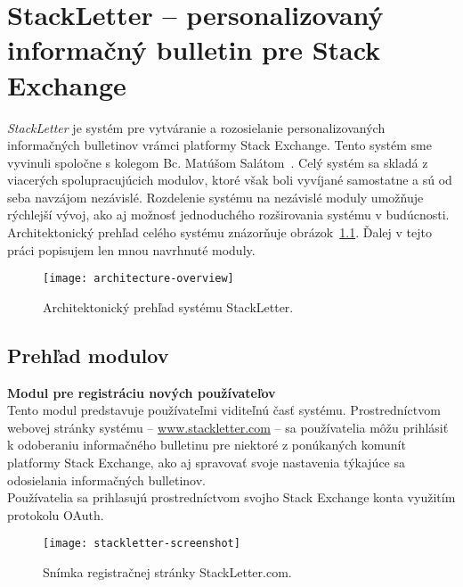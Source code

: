 \newpage
\chapter{StackLetter -- personalizovaný informačný bulletin pre Stack Exchange}

\textit{StackLetter} je systém pre vytváranie a rozosielanie personalizovaných informačných bulletinov vrámci platformy
Stack Exchange. Tento systém sme vyvinuli spoločne s kolegom Bc. Matúšom Salátom~\cite{Salat2018}. Celý systém sa skladá
z viacerých spolupracujúcich modulov, ktoré však boli vyvíjané samostatne a sú od seba navzájom nezávislé. Rozdelenie
systému na nezávislé moduly umožňuje rýchlejší vývoj, ako aj možnosť jednoduchého rozširovania systému v budúcnosti.
Architektonický prehľad celého systému znázorňuje obrázok~\ref{fig:architecutre-overview}. Ďalej v tejto práci popisujem
len mnou navrhnuté moduly.

\begin{figure}[H]\begin{center}
\texttt{[image: architecture-overview]}
\caption{Architektonický prehľad systému StackLetter. \label{fig:architecutre-overview}}\end{center}
\end{figure}

\section{Prehľad modulov}

\textbf{Modul pre registráciu nových používateľov}\\
Tento modul predstavuje používateľmi viditeľnú časť systému. Prostredníctvom webovej stránky systému
-- \url{www.stackletter.com} -- sa používatelia môžu prihlásiť k odoberaniu informačného bulletinu pre niektoré
z ponúkaných komunít platformy Stack Exchange, ako aj spravovať svoje nastavenia týkajúce sa odosielania informačných
bulletinov.\\
Používatelia sa prihlasujú prostredníctvom svojho Stack Exchange konta využitím protokolu OAuth.

\begin{figure}[H]\begin{center}
\texttt{[image: stackletter-screenshot]}
\caption{Snímka registračnej stránky StackLetter.com. \label{fig:stackletter.com}}\end{center}
\end{figure}


